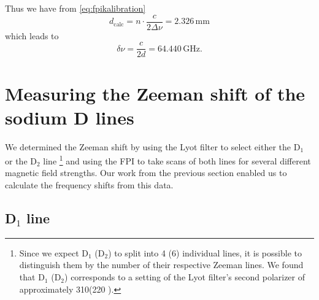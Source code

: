 Thus we have from \eqref{eq:fpikalibration} 
\begin{equation}
	d_{\text{calc}}=n\cdot\frac{c}{2\Delta\nu}=2.326 \,\si{\milli\metre}
\end{equation}
which leads to
\begin{equation}
	\delta\nu=\frac{c}{2d}=64.440 \,\si{\giga\hertz}.
\end{equation}

\section{Measuring the Zeeman shift of the sodium D lines}
We determined the Zeeman shift by using the Lyot filter to select either the D$_1$ or the D$_2$ line \footnote{Since we expect D$_1$ (D$_2$) to split into 4 (6) individual lines, it is possible to distinguish them by the number of their respective Zeeman lines. We found that D$_1$ (D$_2$) corresponds to a setting of the Lyot filter's second polarizer of approximately 310\degree (220 \degree).} and using the FPI to take scans of both lines for several different magnetic field strengths.
Our work from the previous section enabled us to calculate the frequency shifts from this data.
\subsection{D$_1$ line}

